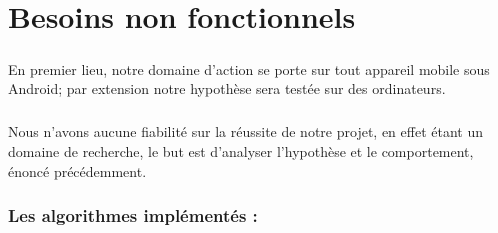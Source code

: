 \chapter{Besoins non fonctionnels}

\paragraph{}
	En premier lieu, notre domaine d'action se porte sur tout appareil mobile sous Android; par extension notre hypothèse sera testée sur des ordinateurs.
\paragraph{}
	Nous n'avons aucune fiabilité sur la réussite de notre projet, en effet étant un domaine de recherche, le but est d'analyser l'hypothèse et le comportement, énoncé précédemment.

\subsection*{Les algorithmes implémentés :\\}

